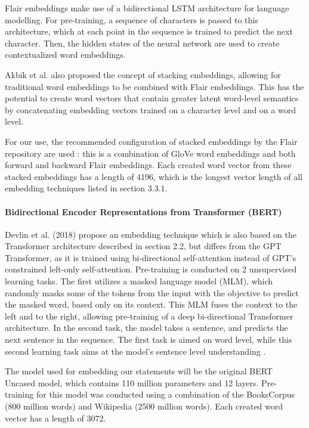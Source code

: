 Flair embeddings make use of a bidirectional LSTM architecture for language modelling. 
For pre-training, a sequence of characters is passed to this architecture, which at each point in the sequence is trained to predict the next character.
Then, the hidden states of the neural network are used to create contextualized word embeddings.

Akbik et al. also proposed the concept of stacking embeddings, allowing for traditional word embeddings to be combined with Flair embeddings.
This has the potential to create word vectors that contain greater latent word-level semantics by concatenating embedding vectors trained on a character level and on a word level\nocite{akbik2018}.

For our use, the recommended configuration of stacked embeddings by the Flair repository are used \cite{flairembedding}: this is a combination of GloVe word embeddings \cite{pennington2014} and both forward and backward Flair embeddings.
Each created word vector from these stacked embeddings has a length of 4196, which is the longest vector length of all embedding techniques listed in section 3.3.1. 

\paragraph{Bidirectional Encoder Representations from Transformer (BERT)}
Devlin et al. (2018) propose an embedding technique which is also based on the Transformer architecture described in section 2.2, but differs from the GPT Transformer, as it is trained using bi-directional self-attention instead of GPT's constrained left-only self-attention.
Pre-training is conducted on 2 unsupervised learning tasks. 
The first utilizes a masked language model (MLM), which randomly masks some of the tokens from the input with the objective to predict the masked word, based only on its context.
This MLM fuses the context to the left and to the right, allowing pre-training of a deep bi-directional Transformer architecture.
In the second task, the model takes a sentence, and predicts the next sentence in the sequence. 
The first task is aimed on word level, while this second learning task aims at the model's sentence level understanding \nocite{devlin2018}. 

The model used for embedding our statements will be the original BERT Uncased model, which contains 110 million parameters and 12 layers. 
Pre-training for this model was conducted using a combination of the BooksCorpus (800 million words) and Wikipedia (2500 million words).
Each created word vector has a length of 3072. 

